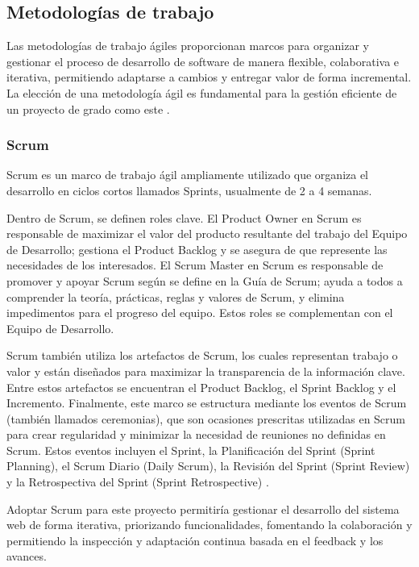 \subsection{Metodologías de trabajo}
Las metodologías de trabajo ágiles proporcionan marcos para organizar y gestionar el proceso de desarrollo de software de manera flexible, colaborativa e iterativa, permitiendo adaptarse a cambios y entregar valor de forma incremental.
La elección de una metodología ágil es fundamental para la gestión eficiente de un proyecto de grado como este \parencite{Beck2001}.

\subsubsection{Scrum}
Scrum es un marco de trabajo ágil ampliamente utilizado que organiza el desarrollo en ciclos cortos llamados Sprints, usualmente de 2 a 4 semanas.

Dentro de Scrum, se definen roles clave.
El Product Owner en Scrum es responsable de maximizar el valor del producto resultante del trabajo del Equipo de Desarrollo; gestiona el Product Backlog y se asegura de que represente las necesidades de los interesados.
El Scrum Master en Scrum es responsable de promover y apoyar Scrum según se define en la Guía de Scrum; ayuda a todos a comprender la teoría, prácticas, reglas y valores de Scrum, y elimina impedimentos para el progreso del equipo.
Estos roles se complementan con el Equipo de Desarrollo.

Scrum también utiliza los artefactos de Scrum, los cuales representan trabajo o valor y están diseñados para maximizar la transparencia de la información clave.
Entre estos artefactos se encuentran el Product Backlog, el Sprint Backlog y el Incremento.
Finalmente, este marco se estructura mediante los eventos de Scrum (también llamados ceremonias), que son ocasiones prescritas utilizadas en Scrum para crear regularidad y minimizar la necesidad de reuniones no definidas en Scrum.
Estos eventos incluyen el Sprint, la Planificación del Sprint (Sprint Planning), el Scrum Diario (Daily Scrum), la Revisión del Sprint (Sprint Review) y la Retrospectiva del Sprint (Sprint Retrospective) \parencite{SchwaberSutherland2020}.

Adoptar Scrum para este proyecto permitiría gestionar el desarrollo del sistema web de forma iterativa, priorizando funcionalidades, fomentando la colaboración y permitiendo la inspección y adaptación continua basada en el feedback y los avances.

